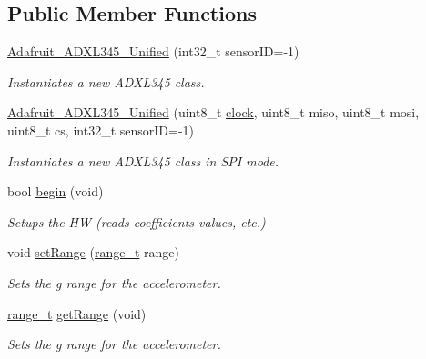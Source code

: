 \subsection*{Public Member Functions}
\begin{DoxyCompactItemize}
\item 
\hyperlink{class_adafruit___a_d_x_l345___unified_a34c57b807ceb0636ab79320231e51dd6}{Adafruit\+\_\+\+A\+D\+X\+L345\+\_\+\+Unified} (int32\+\_\+t sensor\+ID=-\/1)
\begin{DoxyCompactList}\small\item\em Instantiates a new A\+D\+X\+L345 class. \end{DoxyCompactList}\item 
\hyperlink{class_adafruit___a_d_x_l345___unified_a7e0409063a7441c35044902b947d661d}{Adafruit\+\_\+\+A\+D\+X\+L345\+\_\+\+Unified} (uint8\+\_\+t \hyperlink{_weather___balloon_8cpp_a65f172682710866247eacb1ef68df619}{clock}, uint8\+\_\+t miso, uint8\+\_\+t mosi, uint8\+\_\+t cs, int32\+\_\+t sensor\+ID=-\/1)
\begin{DoxyCompactList}\small\item\em Instantiates a new A\+D\+X\+L345 class in S\+PI mode. \end{DoxyCompactList}\item 
bool \hyperlink{class_adafruit___a_d_x_l345___unified_a55b74a63bbb1317228d5bb5905589a02}{begin} (void)
\begin{DoxyCompactList}\small\item\em Setups the HW (reads coefficients values, etc.) \end{DoxyCompactList}\item 
void \hyperlink{class_adafruit___a_d_x_l345___unified_ad722e964df59c7691b1666472940aa99}{set\+Range} (\hyperlink{_adafruit___a_d_x_l345___u_8h_a23c78f6ff1abdabd74f657e54e415e5b}{range\+\_\+t} range)
\begin{DoxyCompactList}\small\item\em Sets the g range for the accelerometer. \end{DoxyCompactList}\item 
\hyperlink{_adafruit___a_d_x_l345___u_8h_a23c78f6ff1abdabd74f657e54e415e5b}{range\+\_\+t} \hyperlink{class_adafruit___a_d_x_l345___unified_adcdcd1ddcd58af6b1d4f85f9ab30d7a4}{get\+Range} (void)
\begin{DoxyCompactList}\small\item\em Sets the g range for the accelerometer. \end{DoxyCompactList}\item 

\end{DoxyCompactItemize}
